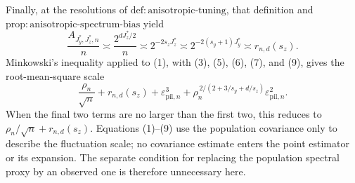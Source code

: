 Finally, at the resolutions of \(\mathrm{def{:}anisotropic\text{-}tuning}\), that definition and \(\mathrm{prop{:}anisotropic\text{-}spectrum\text{-}bias}\) yield
\[
\frac{A_{J_y^*,J_z^*,n}}n
\asymp\frac{2^{dJ_z^*/2}}n
\asymp2^{-2s_zJ_z^*}
\asymp2^{-2(s_y+1)J_y^*}
\asymp r_{n,d}(s_z).                                                      \tag{9}
\]
Minkowski's inequality applied to (1), with (3), (5), (6), (7), and (9), gives the root-mean-square scale
\[
\frac{\rho_n}{\sqrt n}+r_{n,d}(s_z)
+\varepsilon_{\mathrm{pil},n}^3
+\rho_n^{\,2/(2+3/s_y+d/s_z)}\varepsilon_{\mathrm{pil},n}^2.
\]
When the final two terms are no larger than the first two, this reduces to \(\rho_n/\sqrt n+r_{n,d}(s_z)\).  Equations (1)--(9) use the population covariance only to describe the fluctuation scale; no covariance estimate enters the point estimator or its expansion.  The separate condition for replacing the population spectral proxy by an observed one is therefore unnecessary here.